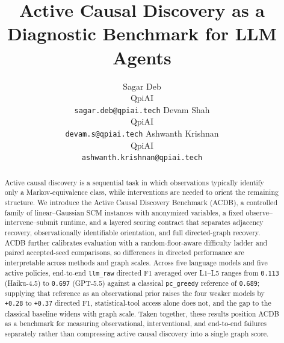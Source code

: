 \documentclass{article}
\title{Active Causal Discovery as a Diagnostic Benchmark for LLM Agents}
\author{%
  Sagar Deb \\
  QpiAI \\
  \texttt{sagar.deb@qpiai.tech}
  \And
  Devam Shah \\
  QpiAI \\
  \texttt{devam.s@qpiai.tech}
  \And
  Ashwanth Krishnan \\
  QpiAI \\
  \texttt{ashwanth.krishnan@qpiai.tech}
}
\begin{document}
\maketitle

\begin{abstract}
Active causal discovery is a sequential task in which observations typically identify only a Markov-equivalence class, while interventions are needed to orient the remaining structure. We introduce the Active Causal Discovery Benchmark (ACDB), a controlled family of linear--Gaussian SCM instances with anonymized variables, a fixed observe--intervene--submit runtime, and a layered scoring contract that separates adjacency recovery, observationally identifiable orientation, and full directed-graph recovery. ACDB further calibrates evaluation with a random-floor-aware difficulty ladder and paired accepted-seed comparisons, so differences in directed performance are interpretable across methods and graph scales. Across five language models and five active policies, end-to-end \texttt{llm\_raw} directed F1 averaged over L1--L5 ranges from \texttt{0.113} (Haiku-4.5) to \texttt{0.697} (GPT-5.5) against a classical \texttt{pc\_greedy} reference of \texttt{0.689}; supplying that reference as an observational prior raises the four weaker models by \texttt{+0.28} to \texttt{+0.37} directed F1, statistical-tool access alone does not, and the gap to the classical baseline widens with graph scale. Taken together, these results position ACDB as a benchmark for measuring observational, interventional, and end-to-end failures separately rather than compressing active causal discovery into a single graph score.
\end{abstract}



\FloatBarrier







\clearpage






\end{document}
